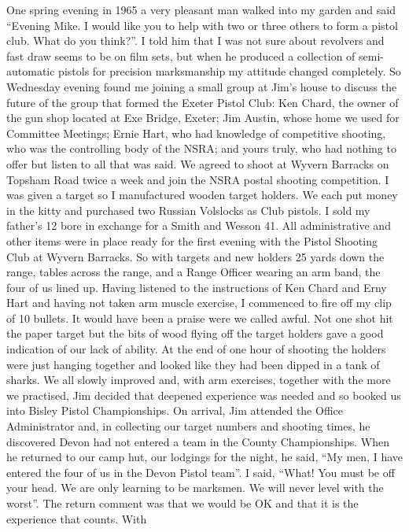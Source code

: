 One spring evening in 1965 a very pleasant man walked into my garden and said
``Evening Mike. I would like you to help with two or three others to form a
pistol club. What do you think?''. I told him that I was not sure about
revolvers and fast draw seems to be on film sets, but when he produced a
collection of semi-automatic pistols for precision marksmanship my attitude
changed completely. So Wednesday evening found me joining a small group at
Jim's house to discuss the future of the group that formed the Exeter Pistol
Club: Ken Chard, the owner of the gun shop located at Exe Bridge, Exeter; Jim
Austin, whose home we used for Committee Meetings; Ernie Hart, who had
knowledge of competitive shooting, who was the controlling body of the NSRA;
and yours truly, who had nothing to offer but listen to all that was said. We
agreed to shoot at Wyvern Barracks on Topsham Road twice a week and join the
NSRA postal shooting competition. I was given a target so I manufactured wooden
target holders. We each put money in the kitty and purchased two Russian
Volslocks as Club pistols. I sold my father's 12 bore in exchange for a Smith
and Wesson 41. All administrative and other items were in place ready for the
first evening with the Pistol Shooting Club at Wyvern Barracks. So with targets
and new holders 25 yards down the range, tables across the range, and a Range
Officer wearing an arm band, the four of us lined up. Having listened to the
instructions of Ken Chard and Erny Hart and having not taken arm muscle
exercise, I commenced to fire off my clip of 10 bullets. It would have been a
praise were we called awful. Not one shot hit the paper target but the bits of
wood flying off the target holders gave a good indication of our lack of
ability. At the end of one hour of shooting the holders were just hanging
together and looked like they had been dipped in a tank of sharks. We all
slowly improved and, with arm exercises, together with the more we practised,
Jim decided that deepened experience was needed and so booked us into Bisley
Pistol Championships. On arrival, Jim attended the Office Administrator and, in
collecting our target numbers and shooting times, he discovered Devon had not
entered a team in the County Championships. When he returned to our camp hut,
our lodgings for the night, he said, ``My men, I have entered the four of us in
the Devon Pistol team''. I said, ``What! You must be off your head. We are only
learning to be marksmen. We will never level with the worst''. The return
comment was that we would be OK and that it is the experience that counts. With
